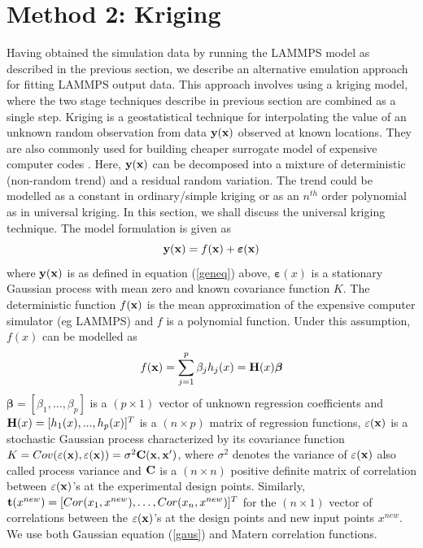 \documentclass[12pt,titlepage]{report}
\newcommand{\bt}{{\bf t}}
\newcommand{\bH}{{\bf H}}
\newcommand{\bC}{{\bf C}}
\newcommand{\bx}{{\bf x}}
\newcommand{\by}{{\bf y}}
\newcommand{\bbeta}{{\boldsymbol{\beta}}}
\theoremstyle{definition}
\theoremstyle{remark}
\begin{document}
\chapter{Method 2: Kriging}
Having obtained the simulation data by running the LAMMPS model as described in the previous section, we describe an alternative emulation approach for fitting LAMMPS output data. This approach involves using a kriging model, where the two stage techniques describe in previous section are combined as a single step. Kriging is a geostatistical technique for interpolating the value of an unknown random observation from data $\by(\bx)$ observed at known locations. They are also commonly used for building cheaper surrogate model of expensive computer codes \cite{pd1,pd2, pd3,pd6}. Here, $\by(\bx)$ can be decomposed into a mixture of deterministic (non-random trend) and a residual random variation. The trend could be modelled as a constant in ordinary/simple kriging or as an $n^{th}$ order polynomial as in universal kriging. In this section, we shall discuss the universal kriging technique. The model formulation is given as
\begin{equation}\label{geneq2}
\by(\bx)= f(\bx) + \boldsymbol \varepsilon(\bx)
\end{equation}
where $\by(\bx)$ is as defined in equation (\ref{geneq}) above, $\boldsymbol \varepsilon(x)$ is a stationary Gaussian process with mean zero and known covariance function $K$. The deterministic function $f(\bx)$ is the mean approximation of the expensive computer simulator (eg LAMMPS) and $f$ is a polynomial function. Under this assumption, $f(x)$ can be modelled as
\begin{equation}
f(\bx) = \sum_{j=1}^{p} \beta_j h_j(x) =\bH(x) \bbeta
\end{equation}
$\bbeta=[\beta_1,\ldots,\beta_p]$ is a $(p\times 1)$ vector of unknown regression coefficients and $\bH(x) = [h_1(x), . . . , h_p(x)]^T$ is a $(n\times p)$ matrix of regression functions,
$\varepsilon(\bx)$ is a stochastic Gaussian process characterized by its covariance function
$K=Cov(\varepsilon(\bx),\varepsilon(\bx)) = \sigma^2\bC(\bx,\bx')$, where $\sigma^2$ denotes the variance of $\varepsilon(\bx)$ also called process variance and $\bC$ is a $(n\times n)$ positive definite matrix of correlation between $\varepsilon(\bx)$'s at the experimental design points.
Similarly, $\bt(x^{new}) = [Cor(x_1, x^{new}), \ldots,Cor(x_n, x^{new})]^T$ for the $(n\times 1)$ vector of correlations between the $\varepsilon(\bx)$'s at the design points and new input points $x^{new}$. We use both Gaussian equation (\ref{gaus}) and Matern correlation functions.
\end{document}
